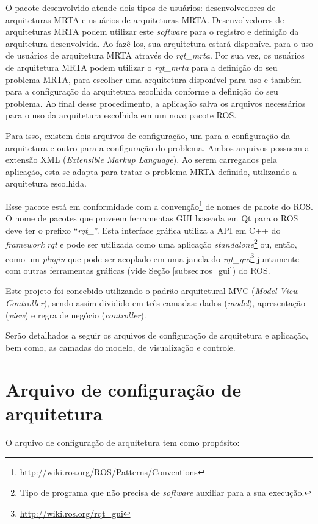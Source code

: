     O pacote desenvolvido atende dois tipos de usuários: desenvolvedores de arquiteturas MRTA e usuários de arquiteturas MRTA. Desenvolvedores de arquiteturas MRTA podem utilizar este \textit{software} para o registro e definição da arquitetura desenvolvida. Ao fazê-los, sua arquitetura estará disponível para o uso de usuários de arquitetura MRTA através do \textit{rqt\_mrta}. Por sua vez, os usuários de arquitetura MRTA podem utilizar o \textit{rqt\_mrta} para a definição do seu problema MRTA, para escolher uma arquitetura disponível para uso e também para a configuração da arquitetura escolhida conforme a definição do seu problema. Ao final desse procedimento, a aplicação salva os arquivos necessários para o uso da arquitetura escolhida em um novo pacote ROS.
    
    Para isso, existem dois arquivos de configuração, um para a configuração da arquitetura e outro para a configuração do problema. Ambos arquivos possuem a extensão XML (\textit{Extensible Markup Language}). Ao serem carregados pela aplicação, esta se adapta para tratar o problema MRTA definido, utilizando a arquitetura escolhida. 
    
    Esse pacote está em conformidade com a convenção\footnote{\url{http://wiki.ros.org/ROS/Patterns/Conventions}} de nomes de pacote do ROS. O nome de pacotes que proveem ferramentas GUI baseada em Qt para o ROS deve ter o prefixo ``\textit{rqt\_}''. Esta interface gráfica utiliza a API em C++ do \textit{framework rqt} e pode ser utilizada como uma aplicação \textit{standalone}\footnote{Tipo de programa que não precisa de \textit{software} auxiliar para a sua execução.} ou, então, como um \textit{plugin} que pode ser acoplado em uma janela do \textit{rqt\_gui}\footnote{\url{http://wiki.ros.org/rqt_gui}} juntamente com outras ferramentas gráficas (vide Seção \ref{subsec:ros_gui}) do ROS.
    
    Este projeto foi concebido utilizando o padrão arquitetural MVC (\textit{Model-View-Controller}), sendo assim dividido em três camadas: dados (\textit{model}), apresentação (\textit{view}) e regra de negócio (\textit{controller}).
    
    Serão detalhados a seguir os arquivos de configuração de arquitetura e aplicação, bem como, as camadas do modelo, de visualização e controle.
        
    \section{Arquivo de configuração de arquitetura} \label{sec:arch_config}
        O arquivo de configuração de arquitetura tem como propósito:
        
